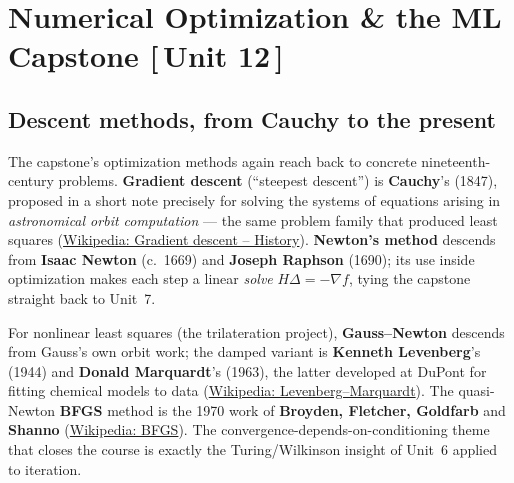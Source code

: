 \documentclass[11pt]{article}
\newcommand{\who}[1]{{\sffamily\bfseries #1}}
\newcommand{\yr}[1]{{\sffamily\color{BrickRed}(#1)}}
\newcommand{\unit}[1]{{\footnotesize\sffamily\color{RoyalBlue}[\,#1\,]}}
\begin{document}
\section{Numerical Optimization \& the ML Capstone \unit{Unit 12}}

\subsection{Descent methods, from Cauchy to the present}
The capstone's optimization methods again reach back to concrete
nineteenth-century problems. \who{Gradient descent} (``steepest descent'') is
\who{Cauchy}'s \yr{1847}, proposed in a short note precisely for solving the
systems of equations arising in \emph{astronomical orbit computation} --- the same
problem family that produced least squares
(\href{https://en.wikipedia.org/wiki/Gradient_descent\#History}{Wikipedia: Gradient
descent -- History}). \who{Newton's method} descends from \who{Isaac Newton}
\yr{c.\ 1669} and \who{Joseph Raphson} \yr{1690}; its use inside optimization makes
each step a linear \emph{solve} $H\Delta = -\nabla f$, tying the capstone straight
back to Unit~7.

For nonlinear least squares (the trilateration project), \who{Gauss--Newton}
descends from Gauss's own orbit work; the damped variant is \who{Kenneth
Levenberg}'s \yr{1944} and \who{Donald Marquardt}'s \yr{1963}, the latter developed
at DuPont for fitting chemical models to data
(\href{https://en.wikipedia.org/wiki/Levenberg\%E2\%80\%93Marquardt_algorithm\#History}{Wikipedia:
Levenberg--Marquardt}). The quasi-Newton \who{BFGS} method is the 1970 work of
\who{Broyden, Fletcher, Goldfarb} and \who{Shanno}
(\href{https://en.wikipedia.org/wiki/Broyden\%E2\%80\%93Fletcher\%E2\%80\%93Goldfarb\%E2\%80\%93Shanno_algorithm}{Wikipedia:
BFGS}). The convergence-depends-on-conditioning theme that closes the course is
exactly the Turing/Wilkinson insight of Unit~6 applied to iteration.
\end{document}
